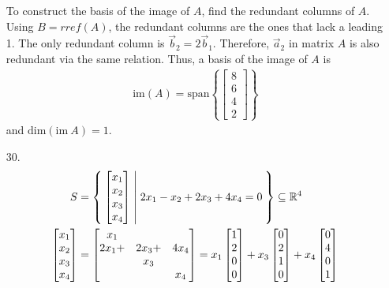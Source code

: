 \documentclass[letterpaper,12pt]{article}
\begin{document}
\begin{enumerate}
    To construct the basis of the image of $A$, find the redundant columns of $A$. Using $B = rref(A)$, the redundant columns are the ones that lack a leading 1. The only redundant column is $\vec{b}_2 = 2\vec{b}_1$. Therefore, $\vec{a}_2$ in matrix $A$ is also redundant via the same relation. Thus, a basis of the image of $A$ is
    \begin{align*}
      \text{im}(A) = \text{span}\left\{
        \begin{bmatrix}
          8 \\ 6 \\ 4 \\ 2
        \end{bmatrix}
      \right\}
    \end{align*}
    and $\text{dim}(\text{im} \ A) = 1$.
  \item[30.]
    \begin{align*}
      S &= \Set{
        \begin{bmatrix}
          x_1 \\ x_2 \\ x_3 \\ x_4
        \end{bmatrix}
        | 2x_1 - x_2 + 2x_3 + 4x_4 = 0
      } \subseteq \mathbb{R}^4 \\
      \begin{bmatrix}
        x_1 \\ x_2 \\ x_3 \\ x_4
      \end{bmatrix} &= \begin{bmatrix}
        x_1 \\
        2x_1 +& 2x_3 +& 4x_4 \\
        & x_3 \\
        & & x_4
      \end{bmatrix} = x_1\begin{bmatrix}
        1 \\ 2 \\ 0 \\ 0
      \end{bmatrix} + x_3\begin{bmatrix}
        0 \\ 2 \\ 1 \\ 0
      \end{bmatrix} + x_4\begin{bmatrix}
        0 \\ 4 \\ 0 \\ 1

\end{bmatrix}
\end{align*}
\end{enumerate}
\end{document}

